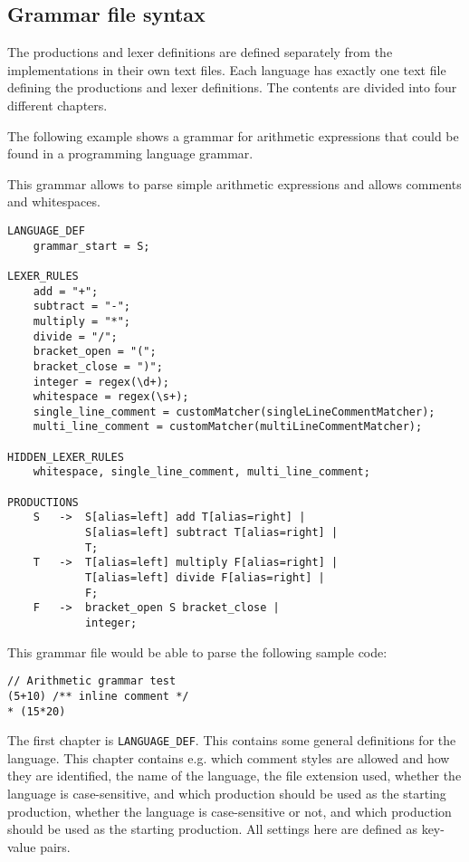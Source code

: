 \subsection{Grammar file syntax}
The productions and lexer definitions are defined separately from the implementations in their own text files. 
Each language has exactly one text file defining the productions and lexer definitions. The contents are divided into four different chapters.

The following example shows a grammar for arithmetic expressions that could be found in a programming language grammar.

This grammar allows to parse simple arithmetic expressions and allows comments and whitespaces.

\begin{lstlisting}[caption=Grammar file example]
LANGUAGE_DEF
    grammar_start = S;

LEXER_RULES
    add = "+";
    subtract = "-";
    multiply = "*";
    divide = "/";
    bracket_open = "(";
    bracket_close = ")";
    integer = regex(\d+);
    whitespace = regex(\s+);
    single_line_comment = customMatcher(singleLineCommentMatcher);
    multi_line_comment = customMatcher(multiLineCommentMatcher);

HIDDEN_LEXER_RULES
    whitespace, single_line_comment, multi_line_comment;

PRODUCTIONS
    S   ->  S[alias=left] add T[alias=right] | 
            S[alias=left] subtract T[alias=right] | 
            T;
    T   ->  T[alias=left] multiply F[alias=right] | 
            T[alias=left] divide F[alias=right] | 
            F;
    F   ->  bracket_open S bracket_close | 
            integer;
\end{lstlisting}

This grammar file would be able to parse the following sample code:

\begin{lstlisting}[caption=Grammar file example]
// Arithmetic grammar test
(5+10) /** inline comment */ 
* (15*20)
\end{lstlisting}

The first chapter is \verb|LANGUAGE_DEF|. This contains some general definitions for the language. 
This chapter contains e.g. which comment styles are allowed and how they are identified, the name of the language, the file extension used, whether the language is case-sensitive, and which production should be used as the starting production, 
whether the language is case-sensitive or not, and which production should be used as the starting production. 
All settings here are defined as key-value pairs.

